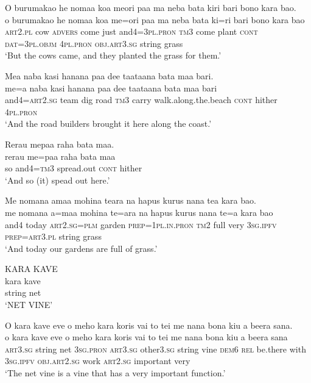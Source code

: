 \newpage
\ea\label{ex:text7-13}
O burumakao he nomaa koa meori paa ma neba bata kiri bari bono kara bao.\\
\gll o	burumakao	he	nomaa	koa	me=ori	paa	ma	neba	bata	ki=ri	bari	bono	kara	bao\\
     \textsc{art}2.\textsc{pl}	cow	\textsc{advers}	come	just	and4=3\textsc{pl}.\textsc{pron}	\textsc{tm}3	come	plant	\textsc{cont}	\textsc{dat}=3\textsc{pl}.\textsc{objm}	4\textsc{pl}.\textsc{pron}	\textsc{obj}.\textsc{art}3.\textsc{sg}	string	grass\\
\glt `But the cows came, and they planted the grass for them.'
\z

\ea\label{ex:text7-14}
Mea naba kasi hanana paa dee taataana bata maa bari.\\
\gll me=a	naba	kasi	hanana	paa	dee	taataana	bata	maa	bari\\
     and4=\textsc{art}2.\textsc{sg}	team	dig	road	\textsc{tm}3	carry	walk.along.the.beach	\textsc{cont}	hither	4\textsc{pl}.\textsc{pron}\\
\glt `And the road builders brought it here along the coast.'
\z

\ea\label{ex:text7-15}
Rerau mepaa raha bata maa.\\
\gll rerau	me=paa	raha	bata	maa\\
     so	and4=\textsc{tm}3	spread.out	\textsc{cont}	hither\\
\glt `And so (it) spead out here.'
\z

\ea\label{ex:text7-16}
Me nomana amaa mohina teara na hapus kurus nana tea kara bao.\\
\gll me	nomana	a=maa	mohina	te=ara	na	hapus	kurus	nana	te=a	kara	bao\\
     and4	today	\textsc{art}2.\textsc{sg}=\textsc{plm}	garden	\textsc{prep}=1\textsc{pl}.\textsc{in}.\textsc{pron}	\textsc{tm}2	full	very	3\textsc{sg}.\textsc{ipfv}	\textsc{prep}=\textsc{art}3.\textsc{pl}	string	grass\\
\glt `And today our gardens are full of grass.'
\z

\ea\label{ex:text7-17}
KARA KAVE\\
\gll kara	kave\\
     string	net\\
\glt `NET VINE'
\z

\ea\label{ex:text7-18}
O kara kave eve o meho kara koris vai to tei me nana bona kiu a beera sana.\\
\gll o	kara	kave	eve	o	meho	kara	koris	vai	to	tei	me	nana	bona	kiu	a	beera	sana\\
     \textsc{art}3.\textsc{sg}	string	net	3\textsc{sg}.\textsc{pron}	\textsc{art}3.\textsc{sg}	other3.\textsc{sg}	string	vine	\textsc{dem}6	\textsc{rel}	be.there	with	3\textsc{sg}.\textsc{ipfv}	\textsc{obj}.\textsc{art}2.\textsc{sg}	work	\textsc{art}2.\textsc{sg}	important	very\\
\glt `The net vine is a vine that has a very important function.'
\z

